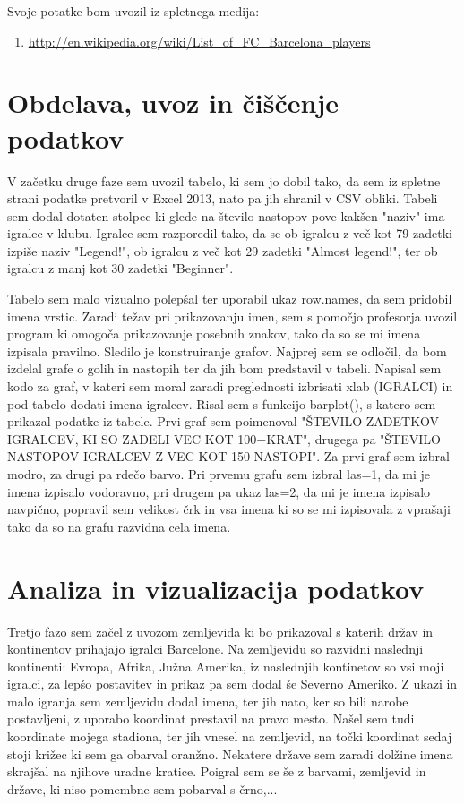 \documentclass[11pt,a4paper]{article}
\begin{document}
Svoje potatke bom uvozil iz spletnega medija: 


\begin{enumerate}
\item{\url{http://en.wikipedia.org/wiki/List_of_FC_Barcelona_players
}}
\end{enumerate}

\section{Obdelava, uvoz in čiščenje podatkov}
V začetku druge faze sem uvozil tabelo, ki sem jo dobil tako, da sem iz spletne strani podatke pretvoril v Excel 2013, nato pa jih shranil v CSV obliki. Tabeli sem dodal dotaten stolpec ki glede na število nastopov pove kakšen "naziv" ima igralec v klubu. Igralce sem razporedil tako, da se ob igralcu z več kot 79 zadetki izpiše naziv "Legend!", ob igralcu z več kot 29 zadetki "Almost legend!", ter ob igralcu z manj kot 30 zadetki "Beginner".

Tabelo sem malo vizualno polepšal ter uporabil ukaz row.names, da sem pridobil imena vrstic. Zaradi težav pri prikazovanju imen, sem s pomočjo profesorja uvozil program ki omogoča prikazovanje posebnih znakov, tako da so se mi imena izpisala pravilno.
Sledilo je konstruiranje grafov. Najprej sem se odločil, da bom izdelal grafe o golih in nastopih ter da jih bom predstavil v tabeli. Napisal sem kodo za graf, v kateri sem moral zaradi preglednosti izbrisati xlab (IGRALCI) in pod tabelo dodati imena igralcev. Risal sem s funkcijo barplot(), s katero sem prikazal podatke iz tabele. Prvi graf sem poimenoval "ŠTEVILO ZADETKOV IGRALCEV, KI SO ZADELI VEC KOT 100−KRAT", drugega pa "ŠTEVILO NASTOPOV IGRALCEV Z VEC KOT 150 NASTOPI". Za prvi graf sem izbral modro, za drugi pa rdečo barvo. Pri prvemu grafu sem izbral las=1, da mi je imena izpisalo vodoravno, pri drugem pa ukaz las=2, da mi je imena izpisalo navpično, popravil sem velikost črk in vsa imena ki so se mi izpisovala z vprašaji tako da so na grafu razvidna cela imena.
\newpage
\section{Analiza in vizualizacija podatkov}
Tretjo fazo sem začel z uvozom zemljevida ki bo prikazoval s katerih držav in kontinentov prihajajo igralci Barcelone. Na zemljevidu so razvidni naslednji kontinenti: Evropa, Afrika, Južna Amerika, iz naslednjih kontinetov so vsi moji igralci, za lepšo postavitev in prikaz pa sem dodal še Severno Ameriko. Z ukazi in malo igranja sem zemljevidu dodal imena, ter jih nato, ker so bili narobe postavljeni, z uporabo koordinat prestavil na pravo mesto. Našel sem tudi koordinate mojega stadiona, ter jih vnesel na zemljevid, na točki koordinat sedaj stoji križec ki sem ga obarval oranžno. Nekatere države sem zaradi dolžine imena skrajšal na njihove uradne kratice. Poigral sem se še z barvami, zemljevid in države, ki niso pomembne sem pobarval s črno,...
\end{document}
